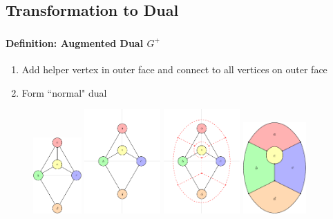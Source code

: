 \documentclass[t,18pt]{beamer}
\begin{document}
\subsection{Transformation to Dual}
\label{subsect:transformation-to-dual}

\begin{frame}[c]
  \frametitle{}
  \framesubtitle{Definition: Augmented Dual $G^+$}
  \begin{enumerate}
    \item Add helper vertex in outer face and connect to all vertices on outer face
    \item Form ``normal" dual
  \end{enumerate}
  \begin{figure}
    \includegraphics[align=c,height=2.90908cm]{../Thesis/Resources/Transformation-AugmentedDual-1.pdf}\;
    \includegraphics[align=c,height=4cm]{../Thesis/Resources/Transformation-AugmentedDual-2.pdf}\;
    \includegraphics[align=c,height=4cm]{../Thesis/Resources/Transformation-AugmentedDual-3.pdf}\;
    \includegraphics[align=c,height=3.5cm]{../Thesis/Resources/Transformation-AugmentedDual-4.pdf}
  \end{figure}
\end{frame}
\end{document}
